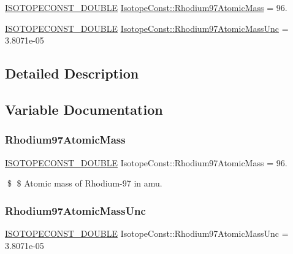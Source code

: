 \begin{DoxyCompactItemize}
\item 
\mbox{\hyperlink{group___isotope_const-_macros_ga8f45a7272ce02c0b4c65c44636ed719a}{I\+S\+O\+T\+O\+P\+E\+C\+O\+N\+S\+T\+\_\+\+D\+O\+U\+B\+LE}} \mbox{\hyperlink{group___isotope_const-_rhodium-_rh97_ga7b07f9cdd4641191bc9e711d641085cf}{Isotope\+Const\+::\+Rhodium97\+Atomic\+Mass}} = 96.
\item 
\mbox{\hyperlink{group___isotope_const-_macros_ga8f45a7272ce02c0b4c65c44636ed719a}{I\+S\+O\+T\+O\+P\+E\+C\+O\+N\+S\+T\+\_\+\+D\+O\+U\+B\+LE}} \mbox{\hyperlink{group___isotope_const-_rhodium-_rh97_ga8f6e9eb984e6c8c5054f2225921de545}{Isotope\+Const\+::\+Rhodium97\+Atomic\+Mass\+Unc}} = 3.\+8071e-\/05
\end{DoxyCompactItemize}


\subsection{Detailed Description}


\subsection{Variable Documentation}
\mbox{\label{group___isotope_const-_rhodium-_rh97_ga7b07f9cdd4641191bc9e711d641085cf}} 
\subsubsection{\texorpdfstring{Rhodium97\+Atomic\+Mass}{Rhodium97AtomicMass}}
{\footnotesize\ttfamily \mbox{\hyperlink{group___isotope_const-_macros_ga8f45a7272ce02c0b4c65c44636ed719a}{I\+S\+O\+T\+O\+P\+E\+C\+O\+N\+S\+T\+\_\+\+D\+O\+U\+B\+LE}} Isotope\+Const\+::\+Rhodium97\+Atomic\+Mass = 96.}

\$ \$ Atomic mass of Rhodium-\/97 in amu. \mbox{\label{group___isotope_const-_rhodium-_rh97_ga8f6e9eb984e6c8c5054f2225921de545}} 
\subsubsection{\texorpdfstring{Rhodium97\+Atomic\+Mass\+Unc}{Rhodium97AtomicMassUnc}}
{\footnotesize\ttfamily \mbox{\hyperlink{group___isotope_const-_macros_ga8f45a7272ce02c0b4c65c44636ed719a}{I\+S\+O\+T\+O\+P\+E\+C\+O\+N\+S\+T\+\_\+\+D\+O\+U\+B\+LE}} Isotope\+Const\+::\+Rhodium97\+Atomic\+Mass\+Unc = 3.\+8071e-\/05}

